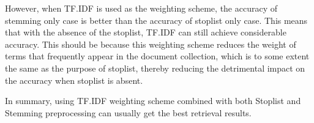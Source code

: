 \documentclass[11pt,a4paper]{article}
\begin{document}
However, when TF.IDF is used as the weighting scheme, the accuracy of stemming only case is better than the accuracy of stoplist only case. This means that with the absence of the stoplist, TF.IDF can still achieve considerable accuracy. This should be because this weighting scheme reduces the weight of terms that frequently appear in the document collection, which is to some extent the same as the purpose of stoplist, thereby reducing the detrimental impact on the accuracy when stoplist is absent.

In summary, using TF.IDF weighting scheme combined with both Stoplist and Stemming preprocessing can usually get the best retrieval results.
\end{document}
